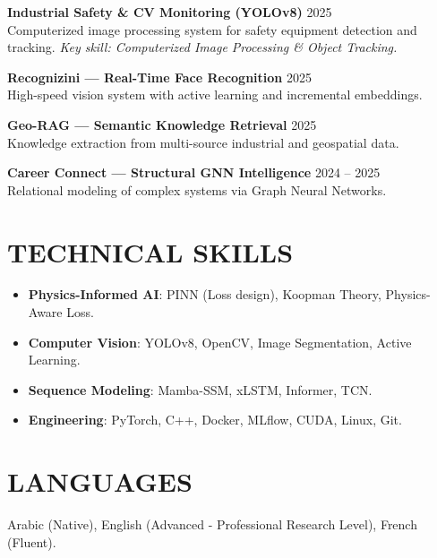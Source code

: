 \documentclass[a4paper,11pt]{article}
\begin{document}
\textbf{Industrial Safety \& CV Monitoring (YOLOv8)} \hfill 2025 \\
Computerized image processing system for safety equipment detection and tracking.
\textit{Key skill: Computerized Image Processing \& Object Tracking.}

\textbf{Recognizini — Real-Time Face Recognition} \hfill 2025 \\
High-speed vision system with active learning and incremental embeddings.

\textbf{Geo-RAG — Semantic Knowledge Retrieval} \hfill 2025 \\
Knowledge extraction from multi-source industrial and geospatial data.

\textbf{Career Connect — Structural GNN Intelligence} \hfill 2024 -- 2025 \\
Relational modeling of complex systems via Graph Neural Networks.

\section{TECHNICAL SKILLS}
\begin{itemize}
    \item \textbf{Physics-Informed AI}: PINN (Loss design), Koopman Theory, Physics-Aware Loss.
    \item \textbf{Computer Vision}: YOLOv8, OpenCV, Image Segmentation, Active Learning.
    \item \textbf{Sequence Modeling}: Mamba-SSM, xLSTM, Informer, TCN.
    \item \textbf{Engineering}: PyTorch, C++, Docker, MLflow, CUDA, Linux, Git.
\end{itemize}

\section{LANGUAGES}
Arabic (Native), English (Advanced - Professional Research Level), French (Fluent).
\end{document}

